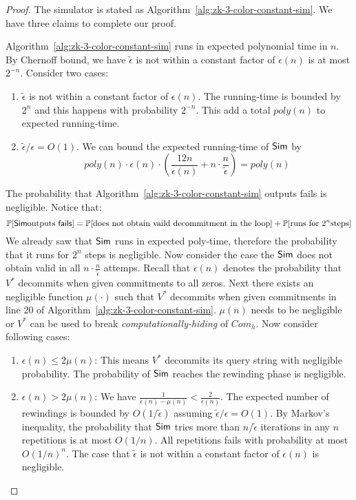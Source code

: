 \begin{proof}
The simulator is stated as Algorithm~\ref{alg:zk-3-color-constant-sim}. We have three claims to complete our proof.
\begin{claim} Algorithm~\ref{alg:zk-3-color-constant-sim} runs in expected polynomial time in $n$.
By Chernoff bound, we have $\widetilde{\epsilon}$ is not within a constant factor of $\epsilon(n)$ is at most $2^{-n}$.
Consider two cases:
\begin{enumerate}
\item $\widetilde{\epsilon}$ is not within a constant factor of $\epsilon(n)$.
	The running-time is bounded by $2^{n}$ and this happens with probability $2^{-n}$. This add a total $poly(n)$ to expected running-time.
\item $\widetilde{\epsilon}/\epsilon=O(1)$.
We can bound the expected running-time of ${\sf Sim}$ by
$$poly(n)\cdot\epsilon(n)\cdot(\frac{12n}{\epsilon(n)}+n\cdot\frac{n}{\widetilde{\epsilon}})=poly(n)$$
\end{enumerate}
\end{claim}
\begin{claim} The probability that Algorithm~\ref{alg:zk-3-color-constant-sim} outputs {\sf fails} is negligible.
Notice that:
$$\mathop{\mathbb P\/}[{\sf Sim} \text{outputs \sf fails}]=\mathop{\mathbb P\/}[\text{does not obtain vaild decommitment in the loop}]+\mathop{\mathbb P\/}[\text{runs for }2^n\text{steps}]$$
We already saw that ${\sf Sim}$ runs in expected poly-time, therefore the probability that it runs for $2^n$ steps is negligible.
Now consider the case the ${\sf Sim}$ does not obtain valid in all $n\cdot\frac{n}{\widetilde{\epsilon}}$ attemps. Recall that $\epsilon(n)$ denotes the probability that $V^*$ decommits when given commitments to all zeros. Next there exists an negligible function $\mu(\cdot)$ such that $V^*$ decommits when given commitments in line 20 of Algorithm~\ref{alg:zk-3-color-constant-sim}. $\mu(n)$ needs to be negligible or $V^*$ can be used to break {\it computationally-hiding} of $Com_h$. Now consider following cases:
\begin{enumerate}
\item $\epsilon(n)\leq 2\mu(n)$: This means $V^*$ decommits its query string with negligible probability. The probability of ${\sf Sim}$ reaches the rewinding phase is negligible.
\item $\epsilon(n)> 2\mu(n)$: We have $\frac{1}{\epsilon(n)-\mu(n)}<\frac{2}{\epsilon(n)}$. The expected number of rewindings is bounded by $O(1/\widetilde{\epsilon})$ assuming $\widetilde{\epsilon}/\epsilon=O(1)$. By Markov's inequality, the probability that ${\sf Sim}$ tries more than $n/\widetilde{\epsilon}$ iterations in any $n$ repetitions is at most $O(1/n)$. All repetitions fails with probability at most $O(1/n)^n$.
The case that $\widetilde{\epsilon}$ is not within a constant factor of $\epsilon(n)$ is negligible.
\end{enumerate}
\end{claim}


\end{proof}
